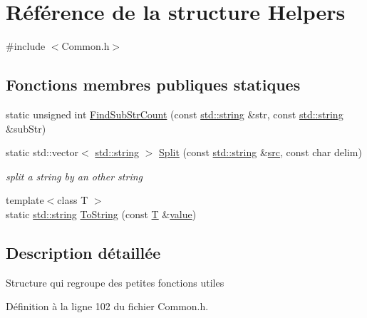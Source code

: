 \hypertarget{struct_helpers}{\section{Référence de la structure Helpers}
\label{struct_helpers}
}


{\ttfamily \#include $<$Common.\-h$>$}

\subsection*{Fonctions membres publiques statiques}
\begin{DoxyCompactItemize}
\item 
static unsigned int \hyperlink{struct_helpers_a0744183c5644f4fed7d8e7879ef64417}{Find\-Sub\-Str\-Count} (const \hyperlink{glext_8h_a06b88fc81ad0b30d1512e9609e3d7c82}{std\-::string} \&str, const \hyperlink{glext_8h_a06b88fc81ad0b30d1512e9609e3d7c82}{std\-::string} \&sub\-Str)
\item 
static std\-::vector$<$ \hyperlink{glext_8h_a06b88fc81ad0b30d1512e9609e3d7c82}{std\-::string} $>$ \hyperlink{struct_helpers_a40fe24353e27a5b542f71c8856149509}{Split} (const \hyperlink{glext_8h_a06b88fc81ad0b30d1512e9609e3d7c82}{std\-::string} \&\hyperlink{glext_8h_a2a98ddb6f79ec1048ff9e15cdd2422ba}{src}, const char delim)
\begin{DoxyCompactList}\small\item\em split a string by an other string \end{DoxyCompactList}\item 
{\footnotesize template$<$class T $>$ }\\static \hyperlink{glext_8h_a06b88fc81ad0b30d1512e9609e3d7c82}{std\-::string} \hyperlink{struct_helpers_af4a24bc3741919a1dace4729299fe58f}{To\-String} (const \hyperlink{mainpage_8dox_a71ef61e8a878d267945d3d068101c6cb}{T} \&\hyperlink{glext_8h_a79169be77d7e02a24f68a5bfe627dc29}{value})
\end{DoxyCompactItemize}


\subsection{Description détaillée}
Structure qui regroupe des petites fonctions utiles 

Définition à la ligne 102 du fichier Common.\-h.



